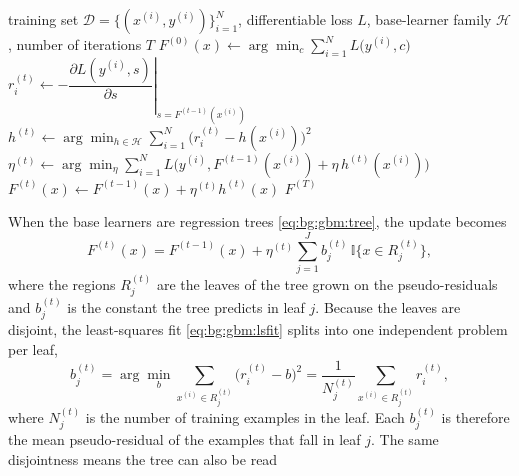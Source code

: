     \begin{algorithm}[h]
        \caption{Gradient boosting~\cite{friedman2001}}
        \label{alg:bg:gbm:gb}
        \begin{algorithmic}[1]
            \Require training set $\mathcal{D} = \{(x^{(i)}, y^{(i)})\}_{i=1}^{N}$,
                     differentiable loss $L$, base-learner family $\mathcal{H}$,
                     number of iterations $T$
            \State $F^{(0)}(x) \gets \arg\min_{c} \sum_{i=1}^{N} L\bigl(y^{(i)}, c\bigr)$
                \State $r_i^{(t)} \gets -\left.\dfrac{\partial L(y^{(i)}, s)}{\partial s}
                       \right|_{s = F^{(t-1)}(x^{(i)})}$
              \EndFor
              \State $h^{(t)} \gets \arg\min_{h \in \mathcal{H}}
                     \sum_{i=1}^{N} \bigl( r_i^{(t)} - h(x^{(i)}) \bigr)^{2}$
              \State $\eta^{(t)} \gets \arg\min_{\eta} \sum_{i=1}^{N}
                     L\bigl( y^{(i)}, F^{(t-1)}(x^{(i)}) + \eta\, h^{(t)}(x^{(i)}) \bigr)$
              \State $F^{(t)}(x) \gets F^{(t-1)}(x) + \eta^{(t)} h^{(t)}(x)$
            \EndFor
            \State \Return $F^{(T)}$
        \end{algorithmic}
    \end{algorithm}
    When the base learners are regression trees \eqref{eq:bg:gbm:tree}, the update
    becomes
    \begin{equation}
    F^{(t)}(x) = F^{(t-1)}(x) + \eta^{(t)} \sum_{j=1}^{J} b_j^{(t)}\,
    \mathbb{I}{\{x \in R_j^{(t)}\}},
    \end{equation}
    where the regions $R_j^{(t)}$ are the leaves of the tree grown on the
    pseudo-residuals and $b_j^{(t)}$ is the constant the tree predicts in leaf
    $j$. Because the leaves are disjoint, the least-squares fit
    \eqref{eq:bg:gbm:lsfit} splits into one independent problem per leaf,
    \begin{equation}
        b_j^{(t)} = \arg\min_{b} \sum_{x^{(i)} \in R_j^{(t)}} \bigl( r_i^{(t)} - b \bigr)^{2}
        = \frac{1}{N_j^{(t)}} \sum_{x^{(i)} \in R_j^{(t)}} r_i^{(t)},
        \label{eq:bg:gbm:leafmean}
    \end{equation}
    where $N_j^{(t)}$ is the number of training examples in the leaf. Each
    $b_j^{(t)}$ is therefore the mean pseudo-residual of the examples that fall in
    leaf $j$. The same disjointness means the tree can also be read
